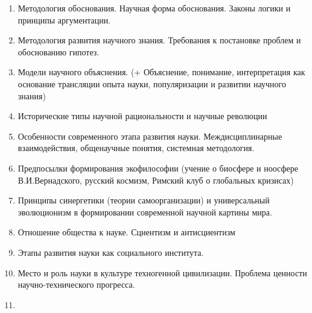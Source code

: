 \documentclass[main.tex]{subfiles}
\begin{document}
\begin{enumerate}
	\item Методология обоснования. Научная форма обоснования. Законы логики и принципы аргументации.
	\item Методология развития научного знания. Требования к постановке проблем и обоснованию гипотез.
	\item Модели научного объяснения. (+ Объяснение, понимание, интерпретация как основание трансляции опыта науки, популяризации и развитии научного знания)
	\item Исторические типы научной рациональности и научные революции
	\item Особенности современного этапа развития науки. Междисциплинарные взаимодействия, общенаучные понятия, системная методология.
	\item Предпосылки формирования экофилософии (учение о биосфере и ноосфере В.И.Вернадского, русский космизм, Римский клуб о глобальных кризисах)
	\item Принципы синергетики (теории самоорганизации) и универсальный эволюционизм в формировании современной научной картины мира.
	\item Отношение общества к науке. Сциентизм и антисциентизм
	\item Этапы развития науки как социального института.
	\item Место и роль науки в культуре техногенной цивилизации. Проблема ценности научно-технического прогресса.
	\item 
\end{enumerate}
\end{document}
